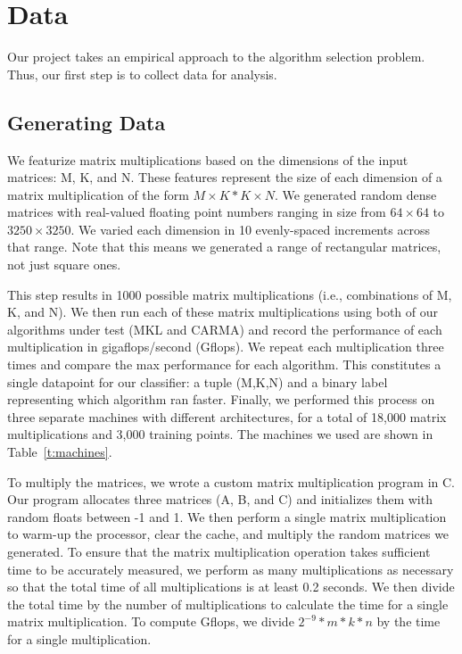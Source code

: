 \section{Data}
\label{s:data}

Our project takes an empirical approach to the algorithm selection problem.
Thus, our first step is to collect data for analysis.

\subsection{Generating Data}
\label{s:data:gen}
We featurize matrix multiplications based on the dimensions of the input matrices: M, K, and N.
These features represent the size of each dimension of a matrix multiplication of the form $M\times{K} * K\times{N}$.
We generated random dense matrices with real-valued floating point numbers ranging in size from $64\times{64}$ to $3250\times{3250}$.
We varied each dimension in 10 evenly-spaced increments across that range.
Note that this means we generated a range of rectangular matrices, not just square ones.

This step results in 1000 possible matrix multiplications (i.e., combinations of M, K, and N).
We then run each of these matrix multiplications using both of our algorithms under test (MKL and CARMA) and record the performance of each multiplication in gigaflops/second (Gflops).
We repeat each multiplication three times and compare the max performance for each algorithm.
This constitutes a single datapoint for our classifier: a tuple (M,K,N) and a binary label representing which algorithm ran faster.
Finally, we performed this process on three separate machines with different architectures, for a total of 18,000 matrix multiplications and 3,000 training points.
The machines we used are shown in Table~\ref{t:machines}.

To multiply the matrices, we wrote a custom matrix multiplication program in C.
Our program allocates three matrices (A, B, and C) and initializes them with random floats between -1 and 1.
We then perform a single matrix multiplication to warm-up the processor, clear the cache, and multiply the random matrices we generated.
To ensure that the matrix multiplication operation takes sufficient time to be accurately measured, we perform as many multiplications as necessary so that the total time of all multiplications is at least 0.2 seconds.
We then divide the total time by the number of multiplications to calculate the time for a single matrix multiplication.
To compute Gflops, we divide $2^{-9} * m * k * n$ by the time for a single multiplication.

